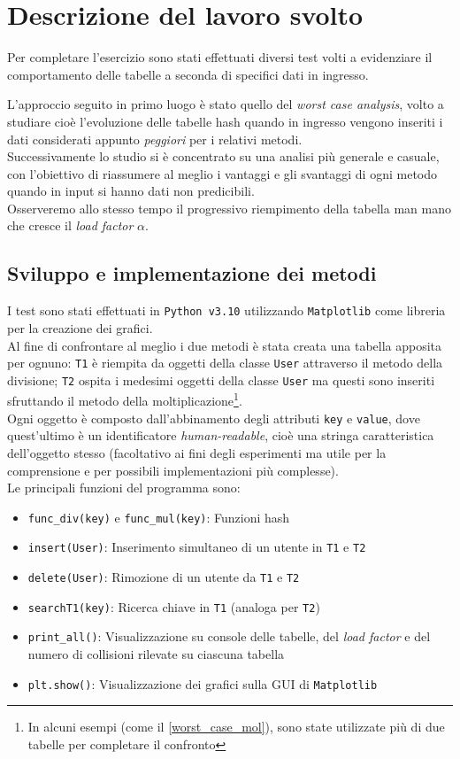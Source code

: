 \section{Descrizione del lavoro svolto} \label{descr_lavoro}

Per completare l'esercizio sono stati effettuati diversi test volti a evidenziare il comportamento delle tabelle a seconda di specifici dati in ingresso.

L'approccio seguito in primo luogo è stato quello del \textit{worst case analysis}, volto a studiare cioè l'evoluzione delle tabelle hash quando in ingresso vengono inseriti i dati considerati appunto \textit{peggiori} per i relativi metodi.
\\ Successivamente lo studio si è concentrato su una analisi più generale e casuale, con l'obiettivo di riassumere al meglio i vantaggi e gli svantaggi di ogni metodo quando in input si hanno dati non predicibili.
\\Osserveremo allo stesso tempo il progressivo riempimento della tabella man mano che cresce il \textit{load factor} $\alpha$.

\subsection{Sviluppo e implementazione dei metodi}
I test sono stati effettuati in \verb|Python v3.10| utilizzando \verb|Matplotlib| come libreria per la creazione dei grafici.
\\Al fine di confrontare al meglio i due metodi è stata creata una tabella apposita per ognuno: \verb|T1| è riempita da oggetti della classe \verb|User| attraverso il metodo della divisione; \verb|T2| ospita i medesimi oggetti della classe \verb|User| ma questi sono inseriti sfruttando il metodo della moltiplicazione\footnote{In alcuni esempi (come il \ref{worst_case_mol}), sono state utilizzate più di due tabelle per completare il confronto}.
\\ Ogni oggetto è composto dall'abbinamento degli attributi \verb|key| e \verb|value|, dove quest'ultimo è un identificatore \textit{human-readable}, cioè una stringa caratteristica dell'oggetto stesso (facoltativo ai fini degli esperimenti ma utile per la comprensione e per possibili implementazioni più complesse).
\\ Le principali funzioni del programma sono:
\begin{itemize}
    \item \verb|func_div(key)| e \verb|func_mul(key)|: Funzioni hash
    \item \verb|insert(User)|: Inserimento simultaneo di un utente in \verb|T1| e \verb|T2|
    \item \verb|delete(User)|: Rimozione di un utente da \verb|T1| e \verb|T2|
    \item \verb|searchT1(key)|: Ricerca chiave in \verb|T1| (analoga per \verb|T2|)
    \item \verb|print_all()|: Visualizzazione su console delle tabelle, del \textit{load factor} e del numero di collisioni rilevate su ciascuna tabella
    \item \verb|plt.show()|: Visualizzazione dei grafici sulla GUI di \verb|Matplotlib|
\end{itemize}


